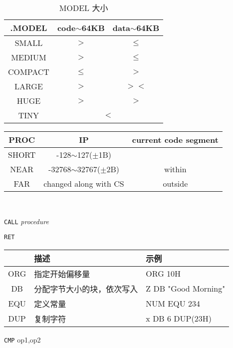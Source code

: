 \begin{table}[H]
	\centering
	\caption{MODEL 大小}
	\begin{tabular}{|>{\ttfamily}c|c|c|}
		\hline
		.MODEL & code$\sim$64KB & data$\sim$64KB \\
		\hline
		SMALL & $>$& $\leq$ \\
		MEDIUM & $>$ & $\leq$ \\
		COMPACT & $\leq$ & $>$\\
		LARGE &$>$ &$><$ \\
		HUGE &$>$ &$>$ \\
		\cline{2-3}
		TINY &\multicolumn{2}{c|}{$<$} \\
		\hline
	\end{tabular}
\end{table}

\begin{table*}
	\begin{minipage}{0.6\textwidth}
		\centering
		\caption{PROC 范围}
		\begin{tabular}{|>{\ttfamily}c|c|c|}
			\hline
			PROC & IP & current code segment \\
			\hline
			SHORT & -128$\sim$127($\pm$1B) &  \\
			\hline
			NEAR & -32768$\sim$32767($\pm$2B) & within \\
			\hline
			FAR & changed along with CS & outside \\
			\hline
		\end{tabular}\\
		\raggedright
		\texttt{CALL} \textit{procedure}\\
		\raggedright\texttt{RET}\\
		\centering
		\caption{数据定义}
		\begin{tabular}{|>{\ttfamily}c|l|>{\ttfamily}l|}
			\hline
			&\bfseries 描述 &\bfseries 示例 \\
			\hline
			ORG & 指定开始偏移量 & ORG 10H \\
			\hline
			DB & 分配字节大小的块，依次写入 & Z DB "Good Morning" \\
			\hline
			EQU & 定义常量 & NUM EQU 234 \\
			\hline
			DUP & 复制字符 & x DB 6 DUP(23H) \\
			\hline
		\end{tabular}
	\end{minipage}
	\begin{minipage}{0.4\textwidth}
		\raggedright
		\texttt{CMP} op1,op2\\
		\centering
		\caption{跳转指令}

\end{minipage}
\end{table*}
